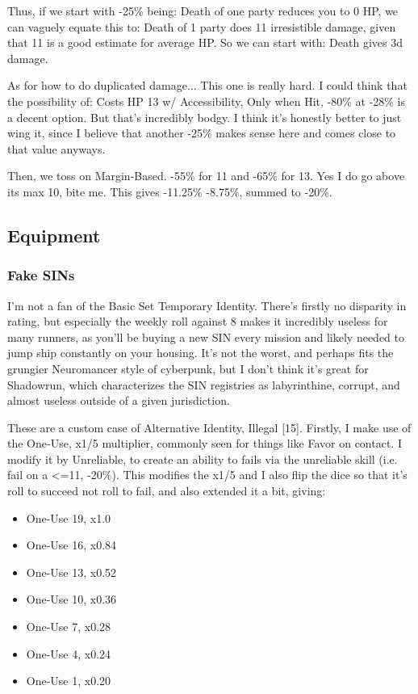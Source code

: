 \begin{multicols*}{2}
	Thus, if we start with -25\% being: Death of one party reduces you to 0 HP, we can vaguely equate this to: Death of 1 party does 11 irresistible damage, given that 11 is a good estimate for average HP. So we can start with: Death gives 3d damage.
	
	As for how to do duplicated damage... This one is really hard. I could think that the possibility of: Costs HP 13 w/ Accessibility, Only when Hit, -80\% at -28\% is a decent option. But that's incredibly bodgy. I think it's honestly better to just wing it, since I believe that another -25\% makes sense here and comes close to that value anyways.
	
	Then, we toss on Margin-Based. -55\% for 11 and -65\% for 13. Yes I do go above its max 10, bite me. This gives -11.25\% -8.75\%, summed to -20\%.
	
	\subsection{Equipment}
	
	\subsubsection{Fake SINs}\label{bts_fake_SIN}
	
	I'm not a fan of the Basic Set Temporary Identity. There's firstly no disparity in rating, but especially the weekly roll against 8 makes it incredibly useless for many runners, as you'll be buying a new SIN every mission and likely needed to jump ship constantly on your housing. It's not the worst, and perhaps fits the grungier Neuromancer style of cyberpunk, but I don't think it's great for Shadowrun, which characterizes the SIN registries as labyrinthine, corrupt, and almost useless outside of a given jurisdiction.
	
	These are a custom case of Alternative Identity, Illegal [15]. Firstly, I make use of the One-Use, x1/5 multiplier, commonly seen for things like Favor on contact. I modify it by Unreliable, to create an ability to fails via the unreliable skill (i.e. fail on a <=11, -20\%). This modifies the x1/5 and I also flip the dice so that it's roll to succeed not roll to fail, and also extended it a bit, giving:
	
	\begin{itemize}
		\itemsep 0pt
		\item One-Use 19, x1.0
		\item One-Use 16, x0.84
		\item One-Use 13, x0.52
		\item One-Use 10, x0.36
		\item One-Use 7, x0.28
		\item One-Use 4, x0.24
		\item One-Use 1, x0.20
	\end{itemize}
	

\end{multicols*}
